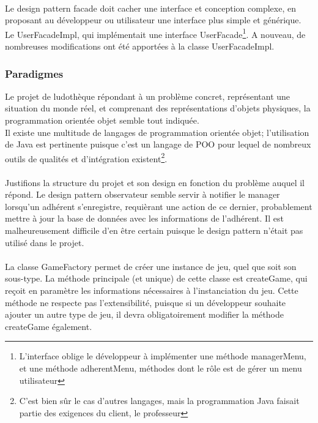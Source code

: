         \paragraph{}
        Le design pattern facade doit cacher une interface et conception complexe, en proposant au développeur ou utilisateur une interface plus simple et générique.\\
        Le UserFacadeImpl, qui implémentait une interface UserFacade\footnote{L'interface oblige le développeur à implémenter une méthode managerMenu, et une méthode adherentMenu, méthodes dont le rôle est de gérer un menu utilisateur}. A nouveau, de nombreuses modifications ont été apportées à la classe UserFacadeImpl.
        
    \subsubsection{Paradigmes}
        Le projet de ludothèque répondant à un problème concret, représentant une situation du monde réel, et comprenant des représentations d'objets physiques, la programmation orientée objet semble tout indiquée. \\ 
        Il existe une multitude de langages de programmation orientée objet; l'utilisation de Java est pertinente puisque c'est un langage de POO pour lequel de nombreux outils de qualités et d'intégration existent\footnote{C'est bien sûr le cas d'autres langages, mais la programmation Java faisait partie des exigences du client, le professeur}. 
        \paragraph{}
        Justifions la structure du projet et son design en fonction du problème auquel il répond.
        \newpage
        Le design pattern observateur semble servir à notifier le manager lorsqu'un adhérent s'enregistre, requièrant une action de ce dernier, probablement mettre à jour la base de données avec les informations de l'adhérent. Il est malheureusement difficile d'en être certain puisque le design pattern n'était pas utilisé dans le projet. 
        \paragraph{}
        La classe GameFactory permet de créer une instance de jeu, quel que soit son sous-type. La méthode principale (et unique) de cette classe est createGame, qui reçoit en paramètre les informations nécessaires à l'instanciation du jeu. Cette méthode ne respecte pas l'extensibilité, puisque si un développeur souhaite ajouter un autre type de jeu, il devra obligatoirement modifier la méthode createGame également. 
